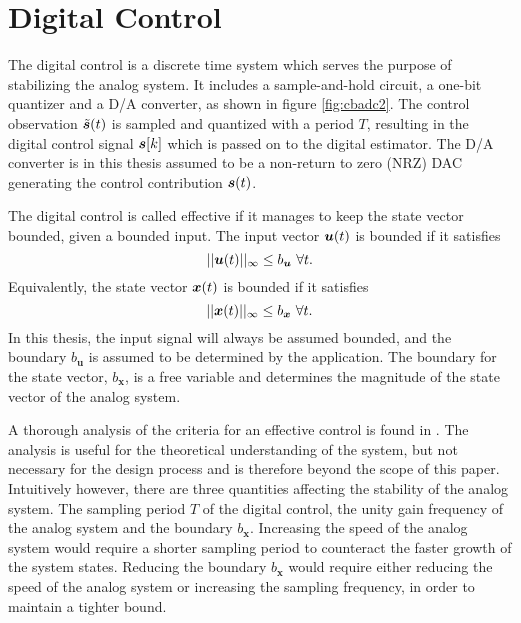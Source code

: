 \section{Digital Control}
\label{sec:04digcontrol}
The digital control is a discrete time system which serves the purpose of stabilizing the analog system. It includes a sample-and-hold circuit, a one-bit quantizer and a D/A converter, as shown in figure \ref{fig:cbadc2}. The control observation $\tilde{\bm{s}}(t)$ is sampled and quantized with a period $T$, resulting in the digital control signal $\bm{s}[k]$ which is passed on to the digital estimator. The D/A converter is in this thesis assumed to be a non-return to zero (NRZ) DAC generating the control contribution $\bm{s}(t)$.

The digital control is called effective if it manages to keep the state vector bounded, given a bounded input. The input vector $\bm{u}(t)$ is bounded if it satisfies
\begin{equation}
    ||\bm{u}(t)||_{\infty} \leq b_{\bm{u}} \ \forall t.
\end{equation}
Equivalently, the state vector $\bm{x}(t)$ is bounded if it satisfies
\begin{equation}
    \label{eq:bx}
    ||\bm{x}(t)||_{\infty} \leq b_{\bm{x}} \ \forall t.
\end{equation}
In this thesis, the input signal will always be assumed bounded, and the boundary $b_{\bm{u}}$ is assumed to be determined by the application. The boundary for the state vector, $b_{\bm{x}}$, is a free variable and determines the magnitude of the state vector of the analog system.

A thorough analysis of the criteria for an effective control is found in \cite{malmberg_thesis}. The analysis is useful for the theoretical understanding of the system, but not necessary for the design process and is therefore beyond the scope of this paper. Intuitively however, there are three quantities affecting the stability of the analog system. The sampling period $T$ of the digital control, the unity gain frequency of the analog system and the boundary $b_{\bm{x}}$. Increasing the speed of the analog system would require a shorter sampling period to counteract the faster growth of the system states. Reducing the boundary $b_{\bm{x}}$ would require either reducing the speed of the analog system or increasing the sampling frequency, in order to maintain a tighter bound.

